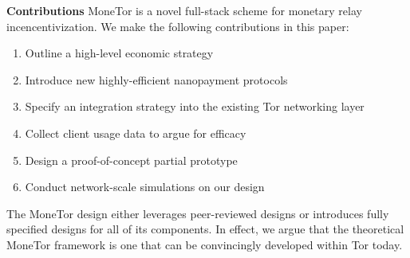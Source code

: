 \textbf{Contributions} MoneTor is a novel full-stack scheme for monetary relay
incencentivization. We make the following contributions in this paper:

\begin{enumerate}
\item Outline a high-level economic strategy
\item Introduce new highly-efficient nanopayment protocols
\item Specify an integration strategy into the existing Tor networking layer
\item Collect client usage data to argue for efficacy
\item Design a proof-of-concept partial prototype
\item Conduct network-scale simulations on our design
\end{enumerate}

The MoneTor design either leverages peer-reviewed designs or introduces fully
specified designs for all of its components. In effect, we argue that the
theoretical MoneTor framework is one that can be convincingly developed within
Tor today.